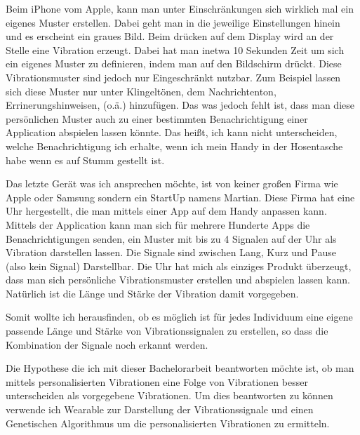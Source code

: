 Beim iPhone vom Apple, kann man unter Einschränkungen sich wirklich mal ein eigenes Muster erstellen. Dabei geht man in die jeweilige Einstellungen hinein und es erscheint ein graues Bild. Beim drücken auf dem Display wird an der Stelle eine Vibration erzeugt. Dabei hat man inetwa 10 Sekunden Zeit um sich ein eigenes Muster zu definieren, indem man auf den Bildschirm drückt. Diese Vibrationsmuster sind jedoch nur Eingeschränkt nutzbar. Zum Beispiel lassen sich diese Muster nur unter Klingeltönen, dem Nachrichtenton, Errinerungshinweisen, (o.ä.) hinzufügen. Das was jedoch fehlt ist, dass man diese persönlichen Muster auch zu einer bestimmten Benachrichtigung einer Application abspielen lassen könnte. Das heißt, ich kann nicht unterscheiden, welche Benachrichtigung ich erhalte, wenn ich mein Handy in der Hosentasche habe wenn es auf Stumm gestellt ist. 

Das letzte Gerät was ich ansprechen möchte, ist von keiner großen Firma wie Apple oder Samsung sondern ein StartUp namens Martian. Diese Firma hat eine Uhr hergestellt, die man mittels einer App auf dem Handy anpassen kann. Mittels der Application kann man sich für mehrere Hunderte Apps die Benachrichtigungen senden, ein Muster mit bis zu 4 Signalen auf der Uhr als Vibration darstellen lassen. Die Signale sind zwischen Lang, Kurz und Pause (also kein Signal) Darstellbar. 
Die Uhr hat mich als einziges Produkt überzeugt, dass man sich persönliche Vibrationsmuster erstellen und abspielen lassen kann. Natürlich ist die Länge und Stärke der Vibration damit vorgegeben.

Somit wollte ich herausfinden, ob es möglich ist für jedes Individuum eine eigene passende Länge und Stärke von Vibrationssignalen zu erstellen, so dass die Kombination der Signale noch erkannt werden.

Die Hypothese die ich mit dieser Bachelorarbeit beantworten möchte ist, ob man mittels personalisierten Vibrationen eine Folge von Vibrationen besser unterscheiden als vorgegebene Vibrationen.
Um dies beantworten zu können verwende ich Wearable zur Darstellung der Vibrationssignale und einen Genetischen Algorithmus um die personalisierten Vibrationen zu ermitteln.